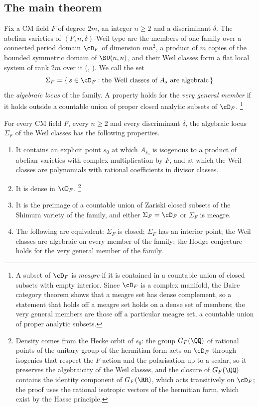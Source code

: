 \subsection{The main theorem}

Fix a CM field $F$ of degree $2m$, an integer $n\ge2$ and a discriminant
$\delta$. The abelian varieties of $(F,n,\delta)$-Weil type are the members of
one family over a connected period domain $\cD_{F}$ of dimension $mn^{2}$, a
product of $m$ copies of the bounded symmetric domain of $\SU(n,n)$, and their
Weil classes form a flat local system of rank $2m$ over it
(, ). We call the set
\[
  \Sigma_{F}=\{\,s\in\cD_{F}:\text{the Weil classes of }A_{s}\text{ are
  algebraic}\,\}
\]
the \emph{algebraic locus} of the family. A property holds for the
\emph{very general member} if it holds outside a countable union of proper
closed analytic subsets of $\cD_{F}$.%
\footnote{A subset of $\cD_{F}$ is \emph{meagre} if it is contained in a
countable union of closed subsets with empty interior. Since $\cD_{F}$ is a
complex manifold, the Baire category theorem shows that a meagre set has
dense complement, so a statement that holds off a meagre set holds on a dense
set of members; the very general members are those off a particular meagre
set, a countable union of proper analytic subsets.}

\begin{theorem}\label{thm:main}
For every CM field $F$, every $n\ge2$ and every discriminant $\delta$, the
algebraic locus $\Sigma_{F}$ of the Weil classes has the following
properties.
\begin{enumerate}[label=\textup{(\roman*)},leftmargin=2.6em,itemsep=2pt]
\item It contains an explicit point $s_{0}$ at which $A_{s_{0}}$ is isogenous
  to a product of abelian varieties with complex multiplication by $F$, and
  at which the Weil classes are polynomials with rational coefficients in
  divisor classes.
\item It is dense in $\cD_{F}$.%
\footnote{Density comes from the Hecke orbit of $s_{0}$: the group
$G_{F}(\QQ)$ of rational points of the unitary group of the hermitian form
acts on $\cD_{F}$ through isogenies that respect the $F$-action and the
polarisation up to a scalar, so it preserves the algebraicity of the Weil
classes, and the closure of $G_{F}(\QQ)$ contains the identity component of
$G_{F}(\RR)$, which acts transitively on $\cD_{F}$; the proof uses the
rational isotropic vectors of the hermitian form, which exist by the Hasse
principle.}
\item It is the preimage of a countable union of Zariski closed subsets of the
  Shimura variety of the family, and either $\Sigma_{F}=\cD_{F}$ or
  $\Sigma_{F}$ is meagre.
\item The following are equivalent: $\Sigma_{F}$ is closed; $\Sigma_{F}$ has
  an interior point; the Weil classes are algebraic on every member of the
  family; the Hodge conjecture holds for the very general member of the
  family.
\end{enumerate}
\end{theorem}

